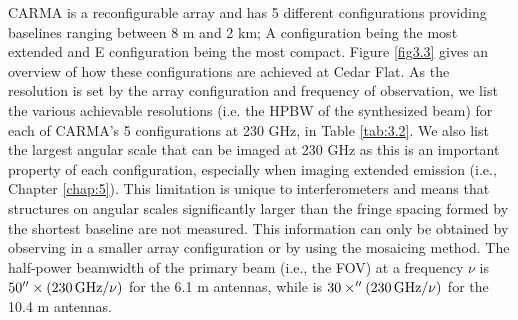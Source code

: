 CARMA is a reconfigurable array and has 5 different configurations providing baselines ranging between 8 m and 2 km; A configuration being the most extended and E configuration being the most compact. Figure \ref{fig3.3} gives an overview of how these configurations are achieved at Cedar Flat. As the resolution is set by the array configuration and frequency of observation, we list the various achievable resolutions (i.e. the HPBW of the synthesized beam) for each of CARMA's 5 configurations at 230 GHz, in Table \ref{tab:3.2}.  We also list the largest angular scale that can be imaged at 230 GHz as this is an important property of each configuration, especially when imaging extended emission (i.e., Chapter \ref{chap:5}). This limitation is unique to interferometers and means that structures on angular scales significantly larger than the fringe spacing formed by the shortest baseline are not measured. This information can only be obtained by observing in a smaller array configuration or by using the mosaicing method. The half-power beamwidth of the primary beam (i.e., the FOV) at a frequency $\nu$ is $50^{\prime\prime} \times (230\,\rm{GHz}/\nu)$ for the 6.1 m antennas, while is $30\times  ^{\prime\prime}(230\,\rm{GHz}/\nu)$ for the 10.4 m antennas.

